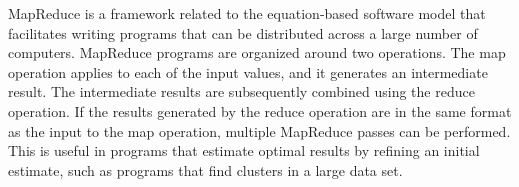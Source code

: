 MapReduce
is a framework related
to the equation-based software model that facilitates writing
programs that can be distributed across a large number of computers.
MapReduce programs are organized around two operations.
The map operation applies to each of the input values, and
it generates an intermediate result.
The intermediate results are subsequently combined using the reduce operation.
If the results generated by the reduce operation are in the same format
as the input to the map operation, multiple MapReduce passes can be performed.
This is useful in programs that estimate optimal results by refining an initial estimate,
such as programs that find clusters in a large data set.

